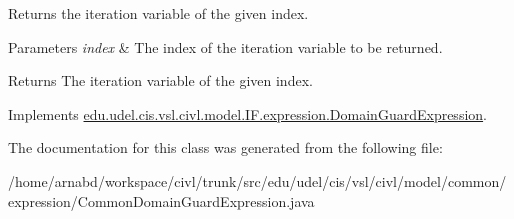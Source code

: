 Returns the iteration variable of the given index. 


\begin{DoxyParams}{Parameters}
{\em index} & The index of the iteration variable to be returned. \\
\hline
\end{DoxyParams}
\begin{DoxyReturn}{Returns}
The iteration variable of the given index. 
\end{DoxyReturn}


Implements \hyperlink{interfaceedu_1_1udel_1_1cis_1_1vsl_1_1civl_1_1model_1_1IF_1_1expression_1_1DomainGuardExpression_a4e20dffbe9dec547cca494a75717b4ec}{edu.\+udel.\+cis.\+vsl.\+civl.\+model.\+I\+F.\+expression.\+Domain\+Guard\+Expression}.



The documentation for this class was generated from the following file\+:\begin{DoxyCompactItemize}
\item 
/home/arnabd/workspace/civl/trunk/src/edu/udel/cis/vsl/civl/model/common/expression/Common\+Domain\+Guard\+Expression.\+java\end{DoxyCompactItemize}
